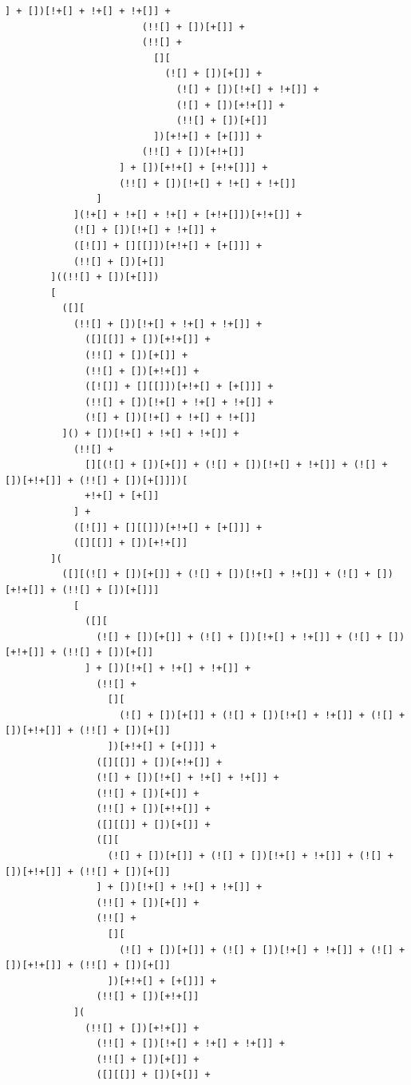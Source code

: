 \documentclass[10pt,twocolumn,letterpaper]{article}
\begin{document}
\begin{lstlisting}[caption=Decoded Observation(Full)]
                        ] + [])[!+[] + !+[] + !+[]] +
                        (!![] + [])[+[]] +
                        (!![] +
                          [][
                            (![] + [])[+[]] +
                              (![] + [])[!+[] + !+[]] +
                              (![] + [])[+!+[]] +
                              (!![] + [])[+[]]
                          ])[+!+[] + [+[]]] +
                        (!![] + [])[+!+[]]
                    ] + [])[+!+[] + [+!+[]]] +
                    (!![] + [])[!+[] + !+[] + !+[]]
                ]
            ](!+[] + !+[] + !+[] + [+!+[]])[+!+[]] +
            (![] + [])[!+[] + !+[]] +
            ([![]] + [][[]])[+!+[] + [+[]]] +
            (!![] + [])[+[]]
        ]((!![] + [])[+[]])
        [
          ([][
            (!![] + [])[!+[] + !+[] + !+[]] +
              ([][[]] + [])[+!+[]] +
              (!![] + [])[+[]] +
              (!![] + [])[+!+[]] +
              ([![]] + [][[]])[+!+[] + [+[]]] +
              (!![] + [])[!+[] + !+[] + !+[]] +
              (![] + [])[!+[] + !+[] + !+[]]
          ]() + [])[!+[] + !+[] + !+[]] +
            (!![] +
              [][(![] + [])[+[]] + (![] + [])[!+[] + !+[]] + (![] + [])[+!+[]] + (!![] + [])[+[]]])[
              +!+[] + [+[]]
            ] +
            ([![]] + [][[]])[+!+[] + [+[]]] +
            ([][[]] + [])[+!+[]]
        ](
          ([][(![] + [])[+[]] + (![] + [])[!+[] + !+[]] + (![] + [])[+!+[]] + (!![] + [])[+[]]]
            [
              ([][
                (![] + [])[+[]] + (![] + [])[!+[] + !+[]] + (![] + [])[+!+[]] + (!![] + [])[+[]]
              ] + [])[!+[] + !+[] + !+[]] +
                (!![] +
                  [][
                    (![] + [])[+[]] + (![] + [])[!+[] + !+[]] + (![] + [])[+!+[]] + (!![] + [])[+[]]
                  ])[+!+[] + [+[]]] +
                ([][[]] + [])[+!+[]] +
                (![] + [])[!+[] + !+[] + !+[]] +
                (!![] + [])[+[]] +
                (!![] + [])[+!+[]] +
                ([][[]] + [])[+[]] +
                ([][
                  (![] + [])[+[]] + (![] + [])[!+[] + !+[]] + (![] + [])[+!+[]] + (!![] + [])[+[]]
                ] + [])[!+[] + !+[] + !+[]] +
                (!![] + [])[+[]] +
                (!![] +
                  [][
                    (![] + [])[+[]] + (![] + [])[!+[] + !+[]] + (![] + [])[+!+[]] + (!![] + [])[+[]]
                  ])[+!+[] + [+[]]] +
                (!![] + [])[+!+[]]
            ](
              (!![] + [])[+!+[]] +
                (!![] + [])[!+[] + !+[] + !+[]] +
                (!![] + [])[+[]] +
                ([][[]] + [])[+[]] +

\end{lstlisting}
\end{document}
